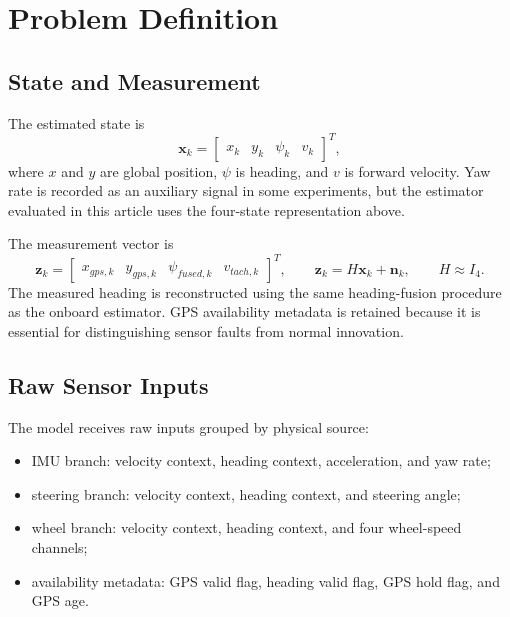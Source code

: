 \documentclass[11pt,a4paper]{article}
\newcommand{\state}{\bm{x}}
\newcommand{\meas}{\bm{z}}
\begin{document}
\section{Problem Definition}

\subsection{State and Measurement}

The estimated state is
\begin{equation}
  \state_k =
  \begin{bmatrix}
    x_k & y_k & \psi_k & v_k
  \end{bmatrix}^{T},
\end{equation}
where $x$ and $y$ are global position, $\psi$ is heading, and $v$ is forward
velocity. Yaw rate is recorded as an auxiliary signal in some experiments, but
the estimator evaluated in this article uses the four-state representation
above.

The measurement vector is
\begin{equation}
  \meas_k =
  \begin{bmatrix}
    x_{gps,k} & y_{gps,k} & \psi_{fused,k} & v_{tach,k}
  \end{bmatrix}^{T},
  \qquad
  \meas_k = H\state_k + \bm{n}_k,
  \qquad
  H \approx I_4 .
\end{equation}
The measured heading is reconstructed using the same heading-fusion procedure
as the onboard estimator. GPS availability metadata is retained because it is
essential for distinguishing sensor faults from normal innovation.

\subsection{Raw Sensor Inputs}

The model receives raw inputs grouped by physical source:
\begin{itemize}
  \item IMU branch: velocity context, heading context, acceleration, and yaw
  rate;
  \item steering branch: velocity context, heading context, and steering angle;
  \item wheel branch: velocity context, heading context, and four wheel-speed
  channels;
  \item availability metadata: GPS valid flag, heading valid flag, GPS hold
  flag, and GPS age.
\end{itemize}
\end{document}
